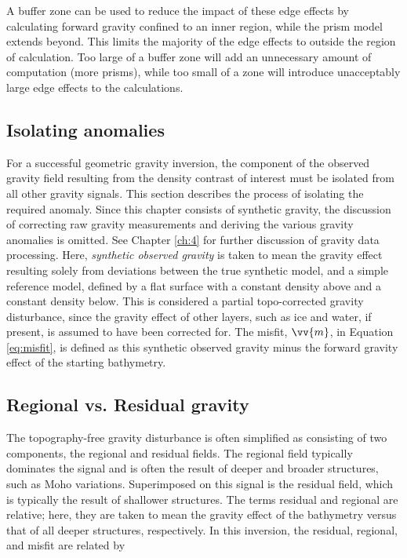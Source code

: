 A buffer zone can be used to reduce the impact of these edge effects by calculating forward gravity confined to an inner region, while the prism model extends beyond. This limits the majority of the edge effects to outside the region of calculation. Too large of a buffer zone will add an unnecessary amount of computation (more prisms), while too small of a zone will introduce unacceptably large edge effects to the calculations.


\subsection{Isolating anomalies}

For a successful geometric gravity inversion, the component of the observed gravity field resulting from the density contrast of interest must be isolated from all other gravity signals. This section describes the process of isolating the required anomaly. Since this chapter consists of synthetic gravity, the discussion of correcting raw gravity measurements and deriving the various gravity anomalies is omitted. See Chapter \ref{ch:4} for further discussion of gravity data processing. Here, \textit{synthetic observed gravity} is taken to mean the gravity effect resulting solely from deviations between the true synthetic model, and a simple reference model, defined by a flat surface with a constant density above and a constant density below. This is considered a partial topo-corrected gravity disturbance, since the gravity effect of other layers, such as ice and water, if present, is assumed to have been corrected for. The misfit, $\vv{m}$, in Equation \ref{eq:misfit}, is defined as this synthetic observed gravity minus the forward gravity effect of the starting bathymetry. \\

\subsection{Regional vs. Residual gravity} \label{chp3_regional_seperation}

The topography-free gravity disturbance is often simplified as consisting of two components, the regional and residual fields. The regional field typically dominates the signal and is often the result of deeper and broader structures, such as Moho variations. Superimposed on this signal is the residual field, which is typically the result of shallower structures. The terms residual and regional are relative; here, they are taken to mean the gravity effect of the bathymetry versus that of all deeper structures, respectively. In this inversion, the residual, regional, and misfit are related by

